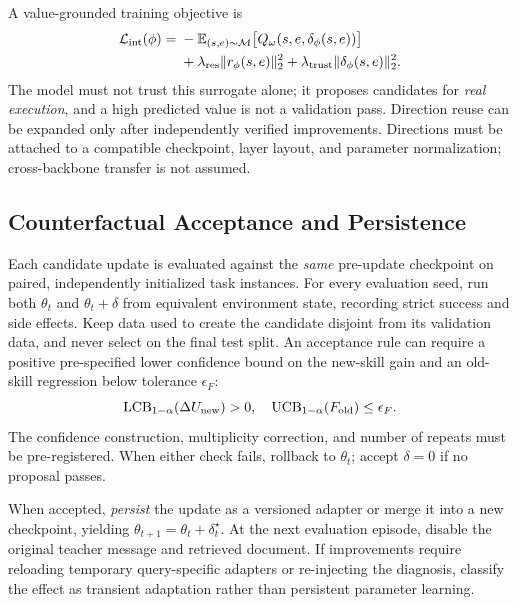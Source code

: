 A value-grounded training objective is
\begin{align}
\mathcal{L}_{\rm int}(\phi)
={}&-\mathbb{E}_{(s,e)\sim\mathcal{M}}
 \big[Q_\omega(s,e,\delta_\phi(s,e))\big]\nonumber\\
 &+\lambda_{\rm res}\|r_\phi(s,e)\|_2^2
 +\lambda_{\rm trust}\|\delta_\phi(s,e)\|_2^2.
\label{eq:generatorloss}
\end{align}
The model must not trust this surrogate alone; it proposes candidates
for \emph{real execution}, and a high predicted value is not a
validation pass. Direction reuse can be expanded only after
independently verified improvements. Directions must be attached
to a compatible checkpoint, layer layout, and parameter
normalization; cross-backbone transfer is not assumed.

\subsection{Counterfactual Acceptance and Persistence}
\label{sec:verification}
Each candidate update is evaluated against the \emph{same}
pre-update checkpoint on paired, independently initialized task
instances. For every evaluation seed, run both $\theta_t$ and
$\theta_t+\delta$ from equivalent environment state, recording
strict success and side effects. Keep data used to create the
candidate disjoint from its validation data, and never select on
the final test split. An acceptance rule can require a positive
pre-specified lower confidence bound on the new-skill gain and an
old-skill regression below tolerance $\epsilon_F$:
\begin{equation}
\mathrm{LCB}_{1-\alpha}(\Delta U_{\rm new})>0,\quad
\mathrm{UCB}_{1-\alpha}(F_{\rm old})\le\epsilon_F.
\label{eq:accept}
\end{equation}
The confidence construction, multiplicity correction, and number
of repeats must be pre-registered. When either check fails,
rollback to $\theta_t$; accept $\delta=0$ if no proposal passes.

When accepted, \emph{persist} the update as a versioned adapter or
merge it into a new checkpoint, yielding
$\theta_{t+1}=\theta_t+\delta_t^\star$.
At the next evaluation episode, disable the original teacher
message and retrieved document. If improvements require reloading
temporary query-specific adapters or re-injecting the diagnosis,
classify the effect as transient adaptation rather than persistent
parameter learning.

